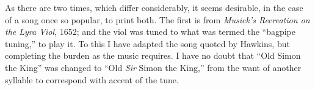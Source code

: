 As there are two times, which differ considerably, it seems desirable, in the
case of a song once so popular, to print both. The first is from \textit{Musick’s
Recreation on the Lyra Viol}, 1652; and the viol was tuned to what was
termed the “bagpipe tuning,” to play it. To this I have adapted the song quoted
by Hawkins, but completing the burden as the music requires. I have no doubt
that “Old Simon the King” was changed to “Old \textit{Sir} Simon the King,” from
the want of another syllable to correspond with accent of the tune.
\pagebreak





\settowidth{\versewidth}{\vin He may hang up himself for shame,}
